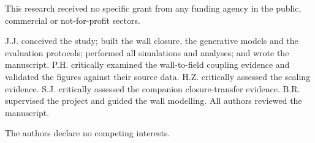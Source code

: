 \documentclass[pdflatex,sn-nature]{sn-jnl}
\begin{document}
 This research received no specific grant from any funding agency in the public,
commercial or not-for-profit sectors.

 J.J. conceived the study; built the wall closure, the generative
models and the evaluation protocols; performed all simulations and analyses; and wrote the
manuscript. P.H. critically examined the wall-to-field coupling evidence and validated the
figures against their source data. H.Z. critically assessed the scaling evidence. S.J.
critically assessed the companion closure-transfer evidence. B.R. supervised the project and
guided the wall modelling. All authors reviewed the manuscript.

 The authors declare no competing interests.
\end{document}
